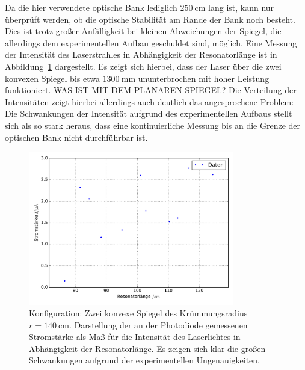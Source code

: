 Da die hier verwendete optische Bank lediglich $\SI{250}{\centi\meter}$ lang ist, kann nur überprüft werden, ob die optische Stabilität am
Rande der Bank noch besteht. Dies ist trotz großer Anfälligkeit bei kleinen Abweichungen der Spiegel, die allerdings dem experimentellen Aufbau
geschuldet sind, möglich. Eine Messung der Intensität des Laserstrahles in Abhängigkeit der Resonatorlänge ist in Abbildung~\ref{fig:kk}
dargestellt. Es zeigt sich hierbei, dass der Laser über die zwei konvexen Spiegel bis etwa $\SI{1300}{\milli\meter}$ ununterbrochen mit hoher Leistung funktioniert.
WAS IST MIT DEM PLANAREN SPIEGEL?
Die Verteilung der Intensitäten zeigt hierbei allerdings auch deutlich das angesprochene Problem: Die Schwankungen der Intensität aufgrund
des experimentellen Aufbaus stellt sich als so stark heraus, dass eine kontinuierliche Messung bis an die Grenze der optischen Bank nicht
durchführbar ist.
%
\begin{figure}[htb]
  \centering
  \includegraphics[width=0.8\textwidth]{auswertung/plot_kk.pdf}
  \caption{Konfiguration: Zwei konvexe Spiegel des Krümmungsradius $r=\SI{140}{\centi\meter}$. Darstellung der an der Photodiode gemessenen Stromstärke als Maß für die Intensität des Laserlichtes in Abhängigkeit der Resonatorlänge. Es zeigen sich klar die großen Schwankungen aufgrund der experimentellen Ungenauigkeiten.}
  \label{fig:kk}
\end{figure}
%
